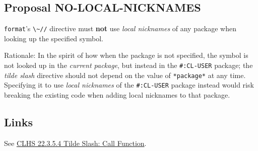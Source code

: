\documentclass[11pt]{article}
\begin{document}
\subsection{Proposal NO-LOCAL-NICKNAMES}
\label{sec:org24e7cde}
\texttt{format}'s \texttt{\textbackslash{}\textasciitilde{}//} directive must \textbf{not} use \emph{local nicknames} of any package when
looking up the specified symbol.

Rationale: In the spirit of how when the package is not specified, the symbol is
not looked up in the \emph{current package}, but instead in the \texttt{\#:CL-USER} package;
the \emph{tilde slash} directive should not depend on the value of \texttt{*package*} at any
time.  Specifying it to use \emph{local nicknames} of the \texttt{\#:CL-USER} package instead
would risk breaking the existing code when adding local nicknames to that package.
\subsection{Links}
\label{sec:org1a644c2}
See \href{https://www.lispworks.com/documentation/HyperSpec/Body/22\_ced.htm}{CLHS 22.3.5.4 Tilde Slash: Call Function}.
\end{document}

